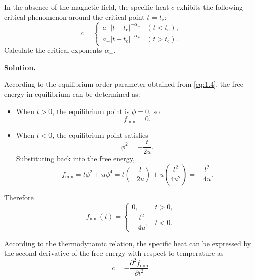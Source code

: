 \documentclass[11pt,a4paper]{article}
\newcounter{problem}
\newcounter{saveequation}
\newenvironment{solution}
{
	\par
	\setcounter{saveequation}{\value{equation}}
	\begingroup
	\setcounter{equation}{0}
	\renewcommand{\theequation}{\arabic{problem}.\arabic{equation}}
	\renewcommand{\theHequation}{sol.\arabic{problem}.\arabic{equation}}
	\noindent\textbf{Solution.}\quad
}
{
	\par
	\endgroup
	\setcounter{equation}{\value{saveequation}}
}
\begin{document}
	\begin{problembox}
		In the absence of the magnetic field, the specific heat $c$ exhibits the following critical phenomenon around the critical point $t = t_{\mathrm c}$:
		\begin{equation}
			c =
			\begin{cases}
				a_- |t - t_{\mathrm c}|^{-\alpha_-} & (t < t_{\mathrm c}), \\
				a_+ |t - t_{\mathrm c}|^{-\alpha_+} & (t > t_{\mathrm c}).
			\end{cases}
			\tag{2}
		\end{equation}
		Calculate the critical exponents $\alpha_{\pm}$.
	\end{problembox}
	\begin{solution}
		According to the equilibrium order parameter obtained from \eqref{eq:1.4}, the free energy in equilibrium can be determined as:
		
		\begin{itemize}
			\item When $t>0$, the equilibrium point is $\phi=0$, so
			\begin{equation}
				f_{\min}=0.
			\end{equation}
			
			\item When $t<0$, the equilibrium point satisfies
			\begin{equation}
				\phi^2=-\frac{t}{2u}.
			\end{equation}
			Substituting back into the free energy,
			\begin{equation}
				f_{\min}=t\phi^2+u\phi^4=t\left(-\frac{t}{2u}\right)+u\left(\frac{t^2}{4u^2}\right)=-\frac{t^2}{4u}.
			\end{equation}
		\end{itemize}
		
		Therefore
		\begin{equation}
			f_{\min}(t)=
			\begin{cases}
				0, & t>0,\\[6pt]
				-\dfrac{t^2}{4u}, & t<0.
			\end{cases}
		\end{equation}
		
		According to the thermodynamic relation, the specific heat can be expressed by the second derivative of the free energy with respect to temperature as
		\begin{equation}
			c=-\frac{\partial^2 f_{\min}}{\partial t^2}.
		\end{equation}
		

\end{solution}
\end{document}
